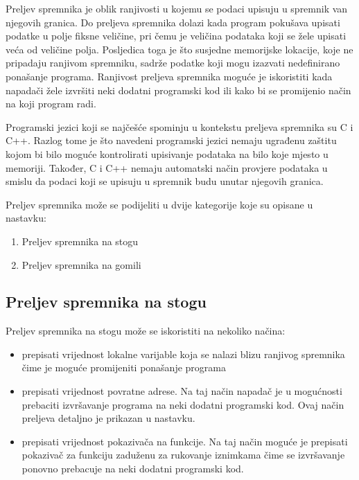 \documentclass[times, utf8, diplomski, numeric]{fer}
\begin{document}
Preljev spremnika je oblik ranjivosti u kojemu se podaci upisuju
u spremnik van njegovih granica. Do preljeva spremnika dolazi
kada program pokušava upisati podatke u polje fiksne veličine,
pri čemu je veličina podataka koji se žele upisati veća od
veličine polja. Posljedica toga je što susjedne memorijske
lokacije, koje ne pripadaju ranjivom spremniku, sadrže podatke
koji mogu izazvati nedefinirano ponašanje programa. Ranjivost				%
preljeva spremnika moguće je iskoristiti kada napadači žele				%
izvršiti neki dodatni programski kod ili kako bi se promijenio				%
način na koji program radi. 

Programski jezici koji se najčešće spominju u kontekstu preljeva
spremnika su C i C++. Razlog tome je što navedeni programski
jezici nemaju ugrađenu zaštitu kojom bi bilo moguće kontrolirati				%
upisivanje podataka na bilo koje mjesto u memoriji. Također, C i
C++ nemaju automatski način provjere podataka u smislu da podaci
koji se upisuju u spremnik budu unutar njegovih granica.

Preljev spremnika može se podijeliti u dvije kategorije koje su
opisane u nastavku:

\begin{enumerate}
\item Preljev spremnika na stogu
\item Preljev spremnika na gomili
\end{enumerate}

\subsection{Preljev spremnika na stogu}

Preljev spremnika na stogu može se iskoristiti na nekoliko
načina:

\begin{itemize}
\item prepisati vrijednost lokalne varijable koja se nalazi blizu
ranjivog spremnika čime je moguće promijeniti ponašanje programa
\item prepisati vrijednost povratne adrese. Na taj način napadač
je u mogućnosti prebaciti izvršavanje programa na neki dodatni 
programski kod. Ovaj način preljeva detaljno je prikazan u nastavku.
\item prepisati vrijednost pokazivača na funkcije. Na taj način
moguće je prepisati pokazivač za funkciju zaduženu za rukovanje
iznimkama čime se izvršavanje ponovno prebacuje na neki dodatni 
programski kod.
\end{itemize}
\end{document}
